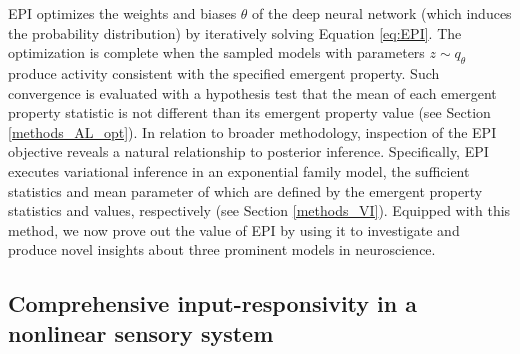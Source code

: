 \documentclass[11pt]{article}
\begin{document}
EPI optimizes the weights and biases $\theta$ of the deep neural network (which induces the probability distribution) by iteratively solving Equation \ref{eq:EPI}. 
The optimization is complete when the sampled models with parameters $z \sim q_\theta$ produce activity consistent with the specified emergent property.  
Such convergence is evaluated with a hypothesis test that the mean of each emergent property statistic is not different than its emergent property value (see Section \ref{methods_AL_opt}). 
In relation to broader methodology, inspection of the EPI objective reveals a natural relationship to posterior inference.
Specifically, EPI executes variational inference in an exponential family model, the sufficient statistics and mean parameter of which are defined by the emergent property statistics and values, respectively (see Section \ref{methods_VI}).
Equipped with this method, we now prove out the value of EPI by using it to investigate and produce novel insights about three prominent models in neuroscience.

\subsection{Comprehensive input-responsivity in a nonlinear sensory system} \label{results_V1}
\end{document}
